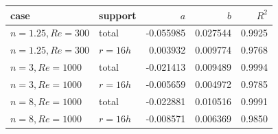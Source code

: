 \begin{tabular}{@{}llrrr@{}}
\toprule
case & support & $a$ & $b$ & $R^2$ \\
\midrule
$n=1.25, Re=300$ & total & -0.055985 & 0.027544 & 0.9925 \\
$n=1.25, Re=300$ & $r=16h$ & 0.003932 & 0.009774 & 0.9768 \\
$n=3, Re=1000$ & total & -0.021413 & 0.009489 & 0.9994 \\
$n=3, Re=1000$ & $r=16h$ & -0.005659 & 0.004972 & 0.9785 \\
$n=8, Re=1000$ & total & -0.022881 & 0.010516 & 0.9991 \\
$n=8, Re=1000$ & $r=16h$ & -0.008571 & 0.006369 & 0.9850 \\
\bottomrule
\end{tabular}
